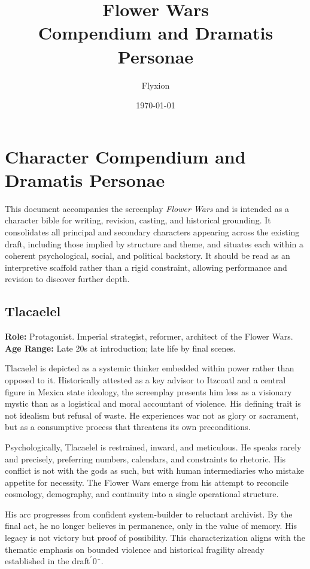 \documentclass[12pt]{article}
\title{\textbf{Flower Wars}\\
\large Compendium and Dramatis Personae}
\author{Flyxion}
\date{\today}
\begin{document}
\maketitle

\section*{Character Compendium and Dramatis Personae}

This document accompanies the screenplay \textit{Flower Wars} and is intended as a character bible for writing, revision, casting, and historical grounding. It consolidates all principal and secondary characters appearing across the existing draft, including those implied by structure and theme, and situates each within a coherent psychological, social, and political backstory. It should be read as an interpretive scaffold rather than a rigid constraint, allowing performance and revision to discover further depth.

\subsection*{Tlacaelel}

\textbf{Role:} Protagonist. Imperial strategist, reformer, architect of the Flower Wars.  
\textbf{Age Range:} Late 20s at introduction; late life by final scenes.

Tlacaelel is depicted as a systemic thinker embedded within power rather than opposed to it. Historically attested as a key advisor to Itzcoatl and a central figure in Mexica state ideology, the screenplay presents him less as a visionary mystic than as a logistical and moral accountant of violence. His defining trait is not idealism but refusal of waste. He experiences war not as glory or sacrament, but as a consumptive process that threatens its own preconditions.

Psychologically, Tlacaelel is restrained, inward, and meticulous. He speaks rarely and precisely, preferring numbers, calendars, and constraints to rhetoric. His conflict is not with the gods as such, but with human intermediaries who mistake appetite for necessity. The Flower Wars emerge from his attempt to reconcile cosmology, demography, and continuity into a single operational structure.

His arc progresses from confident system-builder to reluctant archivist. By the final act, he no longer believes in permanence, only in the value of memory. His legacy is not victory but proof of possibility. This characterization aligns with the thematic emphasis on bounded violence and historical fragility already established in the draft 0.
\end{document}
